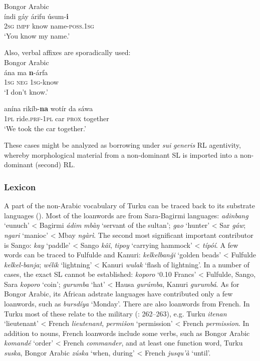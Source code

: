 \documentclass[output=paper]{langsci/langscibook}
\begin{document}
\ea
{Bongor Arabic \citep[180]{Luffin2013}}\\
\gll    índi gáy árifu úsum-\textbf{i} \\
        2\textsc{sg} \textsc{impf} know name-\textsc{poss}.1\textsc{sg}\\
\glt    `You know my name.'
\z
 
{  Also, verbal affixes are sporadically used:}\\
\ea
{Bongor Arabic \citep[181]{Luffin2013}}\\
\ea
\gll ána ma \textbf{n}-árfa \\
         1\textsc{sg} \textsc{neg} 1\textsc{sg}-know\\
\glt    `I don’t know.'

\ex
\gll  anína rikíb-\textbf{na} wotír da sáwa \\
         1\textsc{pl} ride.\textsc{prf}-1\textsc{pl} car \textsc{prox} together\\
\glt    `We took the car together.’
\z
\z
 
{These cases might be analyzed as borrowing under \textit{sui} \textit{generis} RL agentivity, whereby morphological material from a non-dominant SL is imported into a non-dominant (second) RL.} \\


 \subsubsection{Lexicon}

A part of the non-Arabic vocabulary of Turku can be traced back to its substrate languages (\citealt{Avram2019}). Most of the loanwords are from Sara-Bagirmi languages: \textit{adinbang} ‘eunuch’ < Bagirmi \textit{ádim} \textit{mbàŋ} ‘servant of the sultan’; \textit{gao} ‘hunter’ < Sar \textit{gáw}; \textit{ngari} ‘manioc’ < Mbay \textit{ngàrì}. The second most significant important contributor is Sango: \textit{kay} ‘paddle’ < Sango \textit{kâî}, \textit{tipoy} ‘carrying hammock’ < \textit{típóí}. A few words can be traced to Fulfulde and Kanuri: \textit{kelkelbanǧi} ‘golden beads’ < Fulfulde \textit{kelkel-banja}; \textit{wélik} ‘lightning’ < Kanuri \textit{wulak} ‘flash of lightning’. In a number of cases, the exact SL cannot be established: \textit{koporo} ‘0.10 Francs’ < Fulfulde, Sango, Sara \textit{koporo} ‘coin’; \textit{gurumba} ‘hat’ < Hausa \textit{gurúmba}, Kanuri \textit{gurumbá}. As for Bongor Arabic, its African adstrate languages have contributed only a few loanwords, such as \textit{bursdíya} ‘Monday’. There are also loanwords from French. In Turku most of these relate to the military (\citealt{ToscoOwens1993}: 262–263), e.g. Turku \textit{itenan} ‘lieutenant’ < French \textit{lieutenant}, \textit{permišon} ‘permission’ < French \textit{permission}. In addition to nouns, French loanwords include some verbs, such as Bongor Arabic \textit{komandé} ‘order’ < French \textit{commander}, and at least one function word, Turku \textit{suska}, Bongor Arabic \textit{zúska} ‘when, during’ < French \textit{jusqu’à} ‘until’.
\end{document}
